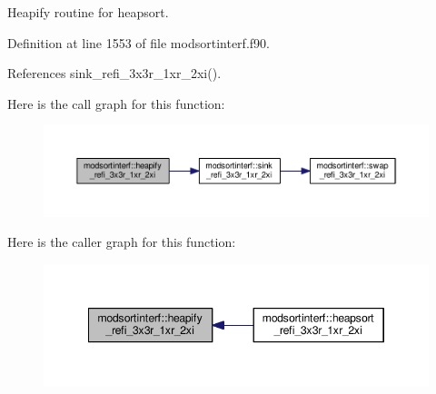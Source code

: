Heapify routine for heapsort. 



Definition at line 1553 of file modsortinterf.\-f90.



References sink\-\_\-refi\-\_\-3x3r\-\_\-1xr\-\_\-2xi().



Here is the call graph for this function\-:\nopagebreak
\begin{figure}[H]
\begin{center}
\leavevmode
\includegraphics[width=350pt]{classmodsortinterf_a50f43f9914d9fe6764df84523b847de7_cgraph}
\end{center}
\end{figure}




Here is the caller graph for this function\-:\nopagebreak
\begin{figure}[H]
\begin{center}
\leavevmode
\includegraphics[width=346pt]{classmodsortinterf_a50f43f9914d9fe6764df84523b847de7_icgraph}
\end{center}
\end{figure}


